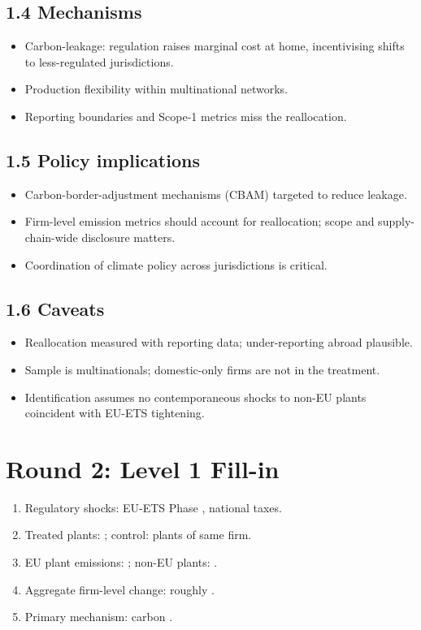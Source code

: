 \documentclass[11pt]{article}
\newcommand{\blank}[1]{\underline{\hspace{#1}}}
\begin{document}
\subsection*{1.4 Mechanisms}
\begin{itemize}
\item Carbon-leakage: regulation raises marginal cost at home, incentivising shifts to less-regulated jurisdictions.
\item Production flexibility within multinational networks.
\item Reporting boundaries and Scope-1 metrics miss the reallocation.
\end{itemize}

\subsection*{1.5 Policy implications}
\begin{itemize}
\item Carbon-border-adjustment mechanisms (CBAM) targeted to reduce leakage.
\item Firm-level emission metrics should account for reallocation; scope and supply-chain-wide disclosure matters.
\item Coordination of climate policy across jurisdictions is critical.
\end{itemize}

\subsection*{1.6 Caveats}
\begin{alertbox}
\begin{itemize}
\item Reallocation measured with reporting data; under-reporting abroad plausible.
\item Sample is multinationals; domestic-only firms are not in the treatment.
\item Identification assumes no contemporaneous shocks to non-EU plants coincident with EU-ETS tightening.
\end{itemize}
\end{alertbox}

\section*{Round 2: Level 1 Fill-in}
\begin{enumerate}
\item Regulatory shocks: EU-ETS Phase \blank{1cm}, national \blank{1.5cm} taxes.
\item Treated plants: \blank{1cm}; control: \blank{1cm} plants of same firm.
\item EU plant emissions: \blank{1cm}; non-EU plants: \blank{1cm}.
\item Aggregate firm-level change: roughly \blank{1cm}.
\item Primary mechanism: carbon \blank{1.5cm}.
\end{enumerate}
\end{document}
